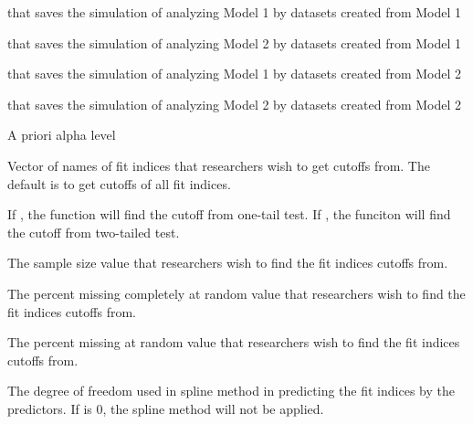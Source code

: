 \documentclass[a4paper]{book}
\begin{document}
\begin{Arguments}
\begin{ldescription}
\item[\code{dat1Mod1}] 
 that saves the simulation of analyzing Model 1 by datasets created from Model 1

\item[\code{dat1Mod2}] 
 that saves the simulation of analyzing Model 2 by datasets created from Model 1

\item[\code{dat2Mod1}] 
 that saves the simulation of analyzing Model 1 by datasets created from Model 2

\item[\code{dat2Mod2}] 
 that saves the simulation of analyzing Model 2 by datasets created from Model 2

\item[\code{alpha}] 
A priori alpha level

\item[\code{usedFit}] 
Vector of names of fit indices that researchers wish to get cutoffs from. The default is to get cutoffs of all fit indices.

\item[\code{onetailed}] 
If , the function will find the cutoff from one-tail test. If , the funciton will find the cutoff from two-tailed test.

\item[\code{nVal}] 
The sample size value that researchers wish to find the fit indices cutoffs from.

\item[\code{pmMCARval}] 
The percent missing completely at random value that researchers wish to find the fit indices cutoffs from.

\item[\code{pmMARval}] 
The percent missing at random value that researchers wish to find the fit indices cutoffs from.

\item[\code{df}] 
The degree of freedom used in spline method in predicting the fit indices by the predictors. If  is 0, the spline method will not be applied.

\end{ldescription}
\end{Arguments}
\end{document}
